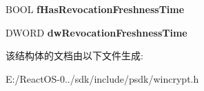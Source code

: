 \begin{DoxyCompactItemize}
\item 
\mbox{\label{struct___c_e_r_t___c_h_a_i_n___c_o_n_t_e_x_t_a4e1e215e724912df06f3bf18833b50e7}} 
B\+O\+OL {\bfseries f\+Has\+Revocation\+Freshness\+Time}
\item 
\mbox{\label{struct___c_e_r_t___c_h_a_i_n___c_o_n_t_e_x_t_a3a1ed2dfc11768ac59f6c2c474121e44}} 
D\+W\+O\+RD {\bfseries dw\+Revocation\+Freshness\+Time}
\end{DoxyCompactItemize}


该结构体的文档由以下文件生成\+:\begin{DoxyCompactItemize}
\item 
E\+:/\+React\+O\+S-\/0../sdk/include/psdk/wincrypt.\+h\end{DoxyCompactItemize}
